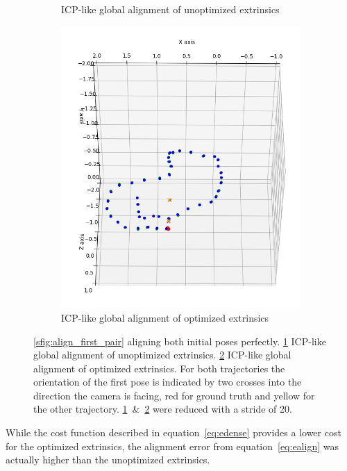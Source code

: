 \begin{figure}[ht]
\begin{subfigure}[b]{.32\textwidth}
                \caption{ICP-like global alignment of unoptimized extrinsics}
                \label{sfig:align_global}
            \end{subfigure}
            \begin{subfigure}[b]{.32\textwidth}
                \includegraphics[width=.95\textwidth]{images/align_global_opt}
                \caption{ICP-like global alignment of optimized extrinsics}
                \label{sfig:align_global_opt}
            \end{subfigure}
            \caption[]{\ref{sfig:align_first_pair} aligning both initial poses perfectly. \ref{sfig:align_global} ICP-like global alignment of unoptimized extrinsics. \ref{sfig:align_global_opt} ICP-like global alignment of optimized extrinsics. For both trajectories the orientation of the first pose is indicated by two crosses into the direction the camera is facing, red for ground truth and yellow for the other trajectory. \ref{sfig:align_global}~\&~\ref{sfig:align_global_opt} were reduced with a stride of 20.}
            \label{fig:vis_perspective}
        \end{figure}
        While the cost function described in equation~\ref{eq:edense} provides a lower cost for the optimized extrinsics, the alignment error from equation~\ref{eq:ealign} was actually higher than the unoptimized extrinsics.
